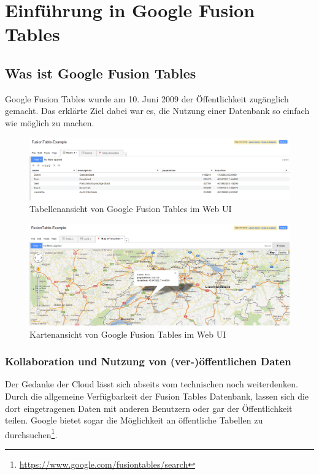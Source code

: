 \chapter{Einführung in Google Fusion Tables}
\label{einfuehrung}

\section{Was ist Google Fusion Tables}
Google Fusion Tables wurde am 10. Juni 2009 der Öffentlichkeit zugänglich gemacht\cite{fusion-table-announce}. Das erklärte Ziel dabei war es, die Nutzung einer Datenbank so einfach wie möglich zu machen.

\begin{figure}[!ht]
	\centering
	\includegraphics[width=\textwidth]{images/einfuehrung/gft-webgui-table}
	\caption{Tabellenansicht von Google Fusion Tables im Web UI}
	\label{gft-webgui-table}
\end{figure}

\begin{figure}[!ht]
	\centering
	\includegraphics[width=\textwidth]{images/einfuehrung/gft-webgui-map}
	\caption{Kartenansicht von Google Fusion Tables im Web UI}
	\label{gft-webgui-map}
\end{figure}

\subsection{Kollaboration und Nutzung von (ver-)öffentlichen Daten}
Der Gedanke der \gls{Cloud} lässt sich abseits vom technischen noch weiterdenken. Durch die allgemeine Verfügbarkeit der Fusion Tables Datenbank, lassen sich die dort eingetragenen Daten mit anderen Benutzern oder gar der Öffentlichkeit teilen. Google bietet sogar die Möglichkeit an öffentliche Tabellen zu durchsuchen\footnote{\url{https://www.google.com/fusiontables/search}}.

